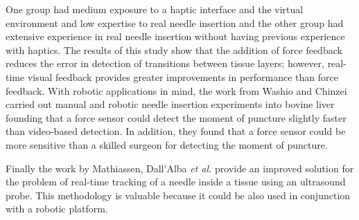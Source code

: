 One group had medium exposure to a haptic interface and the virtual environment and low expertise to real needle insertion and the other group had extensive experience in real needle insertion without having previous experience with haptics.
The results of this study show that the addition of force feedback reduces the error in detection of transitions between tissue layers; however, real-time visual feedback provides greater improvements in performance than force feedback.
With robotic applications in mind, the work from Washio and Chinzei \cite{Washio2004} carried out manual and robotic needle insertion experiments into bovine liver founding that a force sensor could detect the moment of puncture slightly faster than video-based detection. In addition, they found that a force sensor could be more sensitive than a skilled surgeon for detecting the moment of puncture.

Finally the work by Mathiassen, Dall'Alba \textit{et al.} \cite{Mathiassen2013} provide an improved solution for the problem of real-time tracking of a needle inside a tissue using an ultrasound probe. This methodology is valuable because it could be also used in conjunction with a robotic platform.
